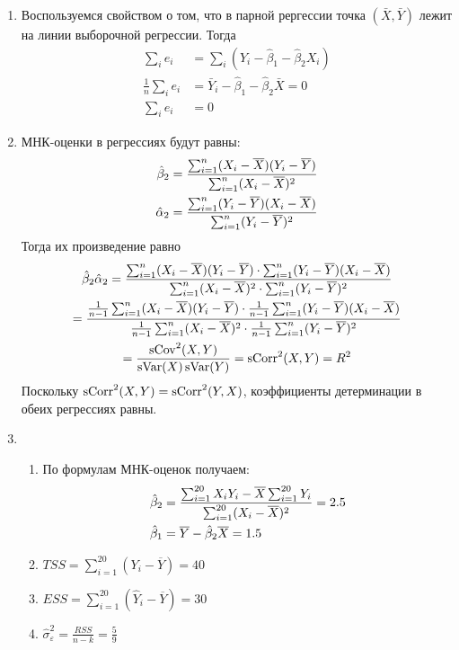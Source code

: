 \begin{enumerate}
\item Воспользуемся свойством о том, что в парной рергессии точка $(\bar X, \bar Y)$
лежит на линии выборочной регрессии. Тогда
\begin{align*}
\sum_i e_i &= \sum_i (Y_i - \hat \beta_1 - \hat \beta_2 X_i) \\
\frac{1}{n} \sum_i e_i &= \bar Y_i -  \hat \beta_1 - \hat \beta_2 \bar X = 0 \\
\sum_i e_i &= 0
\end{align*}

\item МНК-оценки в регрессиях будут равны:
\begin{align*}
\hat{\beta}_2 = \frac{\sum_{i=1}^n (X_i - \overline X)(Y_i - \overline Y)}{\sum_{i=1}^n (X_i - \overline X)^2} \\
\hat\alpha_2 = \frac{\sum_{i=1}^n (Y_i - \overline Y)(X_i - \overline X)}{\sum_{i=1}^n (Y_i - \overline Y)^2}
\end{align*}
Тогда их произведение равно
\begin{multline*}
\hat{\beta}_2 \hat\alpha_2 = \frac{\sum_{i=1}^n (X_i - \overline X)(Y_i - \overline Y) \cdot \sum_{i=1}^n (Y_i - \overline Y)(X_i - \overline X)}{\sum_{i=1}^n (X_i - \overline X)^2 \cdot \sum_{i=1}^n (Y_i - \overline Y)^2} \\
= \frac{\frac{1}{n-1} \sum_{i=1}^n (X_i - \overline X)(Y_i - \overline Y) \cdot \frac{1}{n-1}  \sum_{i=1}^n (Y_i - \overline Y)(X_i - \overline X)}{\frac{1}{n-1} \sum_{i=1}^n (X_i - \overline X)^2 \cdot \frac{1}{n-1} \sum_{i=1}^n (Y_i - \overline Y)^2} \\
= \frac{\operatorname{sCov}^2(X,Y)}{\operatorname{sVar}(X)\operatorname{sVar}(Y)} = \operatorname{sCorr}^2(X,Y) = R^2
\end{multline*}
Поскольку $\operatorname{sCorr}^2(X,Y) = \operatorname{sCorr}^2(Y,X)$, коэффициенты детерминации в обеих регрессиях равны.

\item
\begin{enumerate}
\item По формулам МНК-оценок получаем:
\begin{align*}
&\hat{\beta}_2 = \frac{\sum_{i=1}^{20} X_i Y_i - \overline X \sum_{i=1}^{20} Y_i}{\sum_{i=1}^{20} (X_i - \overline X)^2} = 2.5 \\
&\hat{\beta}_1 = \overline Y - \hat{\beta}_2 \overline X = 1.5
\end{align*}
\item $TSS = \sum_{i=1}^{20} (Y_i - \overline Y) = 40$
\item $ESS = \sum_{i=1}^{20} (\hat Y_i - \overline Y) = 30$
\item $\hat\sigma^2_{\varepsilon} = \frac{RSS}{n-k} = \frac{5}{9}$
\end{enumerate}


\end{enumerate}
